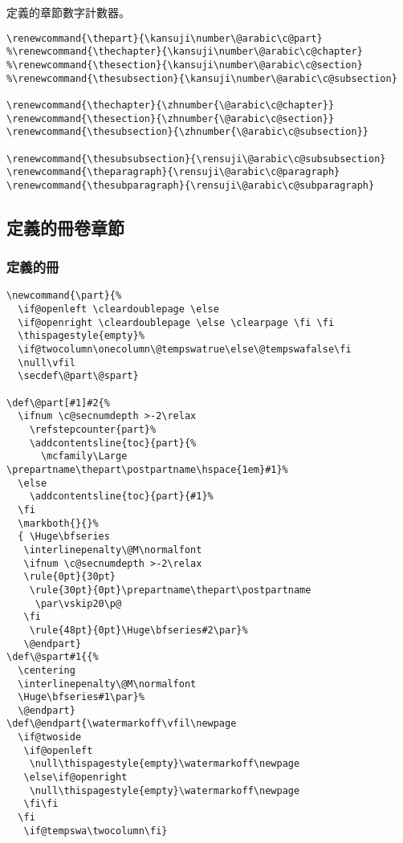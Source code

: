 \par 定義的章節數字計數器。
\begin{lstlisting}[firstnumber=871]
\renewcommand{\thepart}{\kansuji\number\@arabic\c@part}
%\renewcommand{\thechapter}{\kansuji\number\@arabic\c@chapter}
%\renewcommand{\thesection}{\kansuji\number\@arabic\c@section}
%\renewcommand{\thesubsection}{\kansuji\number\@arabic\c@subsection}

\renewcommand{\thechapter}{\zhnumber{\@arabic\c@chapter}}
\renewcommand{\thesection}{\zhnumber{\@arabic\c@section}}
\renewcommand{\thesubsection}{\zhnumber{\@arabic\c@subsection}}

\renewcommand{\thesubsubsection}{\rensuji\@arabic\c@subsubsection}
\renewcommand{\theparagraph}{\rensuji\@arabic\c@paragraph}
\renewcommand{\thesubparagraph}{\rensuji\@arabic\c@subparagraph}
\end{lstlisting}

\subsection{定義的冊卷章節}

\subsubsection{定義的冊}

\begin{lstlisting}[firstnumber=885]
%定義的冊
\newcommand{\part}{%
  \if@openleft \cleardoublepage \else
  \if@openright \cleardoublepage \else \clearpage \fi \fi
  \thispagestyle{empty}%
  \if@twocolumn\onecolumn\@tempswatrue\else\@tempswafalse\fi
  \null\vfil
  \secdef\@part\@spart}

\def\@part[#1]#2{%
  \ifnum \c@secnumdepth >-2\relax
    \refstepcounter{part}%
    \addcontentsline{toc}{part}{%
      \mcfamily\Large \prepartname\thepart\postpartname\hspace{1em}#1}%
  \else
    \addcontentsline{toc}{part}{#1}%
  \fi
  \markboth{}{}%
  { \Huge\bfseries
   \interlinepenalty\@M\normalfont
   \ifnum \c@secnumdepth >-2\relax
   \rule{0pt}{30pt}
    \rule{30pt}{0pt}\prepartname\thepart\postpartname
     \par\vskip20\p@
   \fi
    \rule{48pt}{0pt}\Huge\bfseries#2\par}%
   \@endpart}
\def\@spart#1{{%
  \centering
  \interlinepenalty\@M\normalfont
  \Huge\bfseries#1\par}%
  \@endpart}
\def\@endpart{\watermarkoff\vfil\newpage
  \if@twoside
   \if@openleft
    \null\thispagestyle{empty}\watermarkoff\newpage
   \else\if@openright
    \null\thispagestyle{empty}\watermarkoff\newpage
   \fi\fi
  \fi
   \if@tempswa\twocolumn\fi}
\end{lstlisting}


